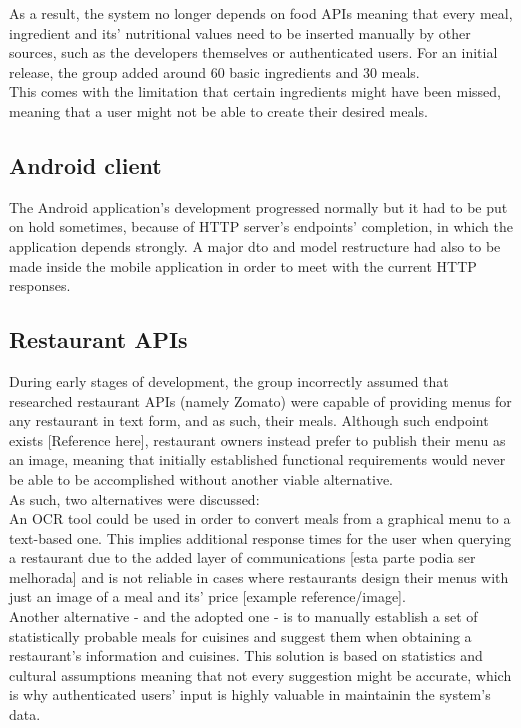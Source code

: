     As a result, the system no longer depends on food APIs meaning that every meal, ingredient and its' nutritional values
    need to be inserted manually by other sources, such as the developers themselves or authenticated users.
    For an initial release, the group added around 60 basic ingredients and 30 meals.\\
    
    This comes with the limitation that certain ingredients might have been missed,
    meaning that a user might not be able to create their desired meals.

    \subsection{Android client}

    The Android application's development progressed normally but it had to be put on hold sometimes, because of HTTP server's endpoints' completion, in which the application
    depends strongly. A major dto and model restructure had also to be made inside the mobile application in order to meet with the current HTTP responses.\\

    \subsection{Restaurant APIs}

    During early stages of development, 
    the group incorrectly assumed that researched restaurant APIs (namely Zomato) were capable 
    of providing menus for any restaurant in text form, and as such, their meals. Although such endpoint exists [Reference here], 
    restaurant owners instead prefer to publish their menu as an image, 
    meaning that initially established functional requirements would never be able to be accomplished without 
    another viable alternative.\\

    As such, two alternatives were discussed:\\

    An OCR tool could be used in order to convert meals from a graphical menu to a text-based one.
    This implies additional response times for the user when querying a restaurant due to the added layer 
    of communications [esta parte podia ser melhorada] and is not reliable in cases where restaurants
    design their menus with just an image of a meal and its' price [example reference/image].\\

    Another alternative - and the adopted one - is to manually establish a set of statistically probable meals for cuisines
    and suggest them when obtaining a restaurant's information and cuisines.
    This solution is based on statistics and cultural assumptions meaning that not every suggestion might be accurate, which is
    why authenticated users' input is highly valuable in maintainin the system's data.\\